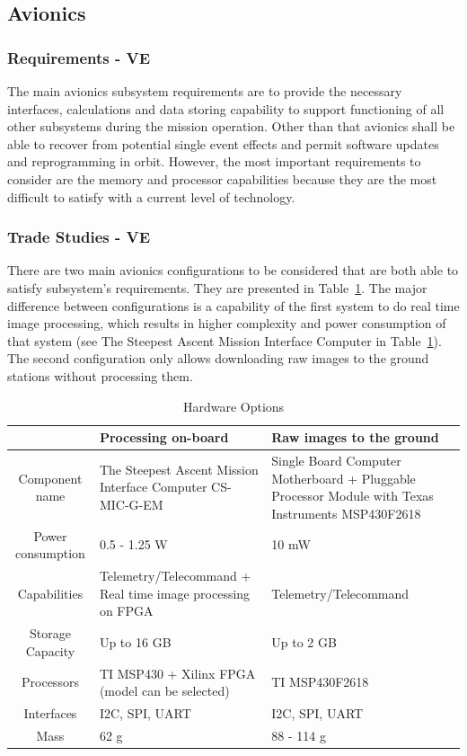\documentclass[12pt]{article}
\begin{document}
\subsection{Avionics}

\subsubsection{Requirements - VE}
The main avionics subsystem requirements are to provide the necessary interfaces, calculations and data storing capability to support functioning of all other subsystems during the mission operation. Other than that avionics shall be able to recover from potential single event effects and permit software updates and reprogramming in orbit.
However, the most important requirements to consider are the memory and processor capabilities because they are the most difficult to satisfy with a current level of technology.

			\subsubsection{Trade Studies - VE}
There are two main avionics configurations to be considered that are both able to satisfy subsystem’s requirements. They are presented in Table~\ref{table:avionics_hardware_options}. The major difference between configurations is a capability of the first system to do real time image processing, which results in higher complexity and power consumption of that system (see The Steepest Ascent Mission Interface Computer in Table~\ref{table:avionics_hardware_options}). The second configuration only allows downloading raw images to the ground stations without processing them.


\begin{table}[ht]
\caption{Hardware Options}
\label{table:avionics_hardware_options}
\begin{center}
    \begin{tabular}{| c || p{6cm} | p{6cm} |} \hline
     &	Processing on-board & Raw images to the ground \\ \hline \hline
    Component name & The Steepest Ascent Mission Interface Computer CS-MIC-G-EM & Single Board Computer Motherboard + Pluggable Processor Module with Texas Instruments MSP430F2618 \\ \hline
    Power consumption & 0.5 - 1.25 W & 10 mW \\ \hline
    Capabilities & Telemetry/Telecommand + Real time image processing on FPGA & Telemetry/Telecommand\\ \hline
    Storage Capacity & Up to 16 GB & Up to 2 GB \\ \hline
    Processors & TI MSP430  + Xilinx FPGA (model can be selected) & TI MSP430F2618 \\ \hline
    Interfaces & I2C, SPI, UART & I2C, SPI, UART \\ \hline
    Mass & 62 g & 88 - 114 g \\ \hline 
    \end{tabular}
\end{center}
\end{table}
\end{document}
